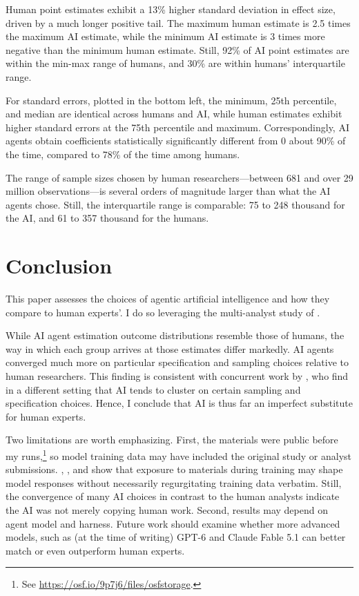 \documentclass[
  12pt]{article}
\begin{document}
Human point estimates exhibit a 13\% higher standard deviation in effect
size, driven by a much longer positive tail. The maximum human estimate
is 2.5 times the maximum AI estimate, while the minimum AI estimate is 3
times more negative than the minimum human estimate. Still, 92\% of AI
point estimates are within the min-max range of humans, and 30\% are
within humans' interquartile range.

For standard errors, plotted in the bottom left, the minimum, 25th
percentile, and median are identical across humans and AI, while human
estimates exhibit higher standard errors at the 75th percentile and
maximum. Correspondingly, AI agents obtain coefficients statistically
significantly different from 0 about 90\% of the time, compared to 78\%
of the time among humans.

The range of sample sizes chosen by human researchers---between 681 and
over 29 million observations---is several orders of magnitude larger
than what the AI agents chose. Still, the interquartile range is
comparable: 75 to 248 thousand for the AI, and 61 to 357 thousand for
the humans.

\section{Conclusion}\label{sec-conclusion}

This paper assesses the choices of agentic artificial intelligence and
how they compare to human experts'. I do so leveraging the multi-analyst
study of \citet{huntingtonklein2025sources}.

While AI agent estimation outcome distributions resemble those of
humans, the way in which each group arrives at those estimates differ
markedly. AI agents converged much more on particular specification and
sampling choices relative to human researchers. This finding is
consistent with concurrent work by \citet{huang2026aierrors}, who find
in a different setting that AI tends to cluster on certain sampling and
specification choices. Hence, I conclude that AI is thus far an
imperfect substitute for human experts.

Two limitations are worth emphasizing. First, the
\citet{huntingtonklein2025sources} materials were public before my
runs,\footnote{See \url{https://osf.io/9p7j6/files/osfstorage}.} so
model training data may have included the original study or analyst
submissions. \citet{karmakar2022codex}, \citet{zhang2023counterfactual},
and \citet{al2026model} show that exposure to materials during training
may shape model responses without necessarily regurgitating training
data verbatim. Still, the convergence of many AI choices in contrast to
the human analysts indicate the AI was not merely copying human work.
Second, results may depend on agent model and harness. Future work
should examine whether more advanced models, such as (at the time of
writing) GPT-6 and Claude Fable 5.1 can better match or even outperform
human experts.



\end{document}
